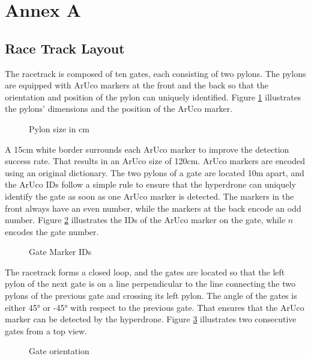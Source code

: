 
\section*{Annex A}
\subsection*{Race Track Layout}
The racetrack is composed of ten gates, each consisting of two pylons. The pylons are equipped with ArUco markers at the front and the back so that the orientation and position of the pylon can uniquely identified. Figure \ref{fig:pylon.size} illustrates the pylons' dimensions and the position of the ArUco marker.
\begin{figure}[H]
  \centering
  
  \caption{Pylon size in cm}
  \label{fig:pylon.size}
\end{figure}
A 15cm white border surrounds each ArUco marker to improve the detection success rate. That results in an ArUco size of 120cm. ArUco markers are encoded using an original dictionary.
The two pylons of a gate are located 10m apart, and the ArUco IDs follow a simple rule to ensure that the hyperdrone can uniquely identify the gate as soon as one ArUco marker is detected. The markers in the front always have an even number, while the markers at the back encode an odd number. Figure \ref{fig:pylon-id} illustrates the IDs of the ArUco marker on the gate, while \(n\) encodes the gate number.
\begin{figure}[H]
  \centering
  
  \caption{Gate Marker IDs}
  \label{fig:pylon-id}
\end{figure}
The racetrack forms a closed loop, and the gates are located so that the left pylon of the next gate is on a line perpendicular to the line connecting the two pylons of the previous gate and crossing its left pylon. The angle of the gates is either 45° or -45° with respect to the previous gate. That ensures that the ArUco marker can be detected by the hyperdrone. Figure \ref{fig:gate-orientation} illustrates two consecutive gates from a top view.
\begin{figure}[H]
  \centering
  
  \caption{Gate orientation}
  \label{fig:gate-orientation}
\end{figure}
